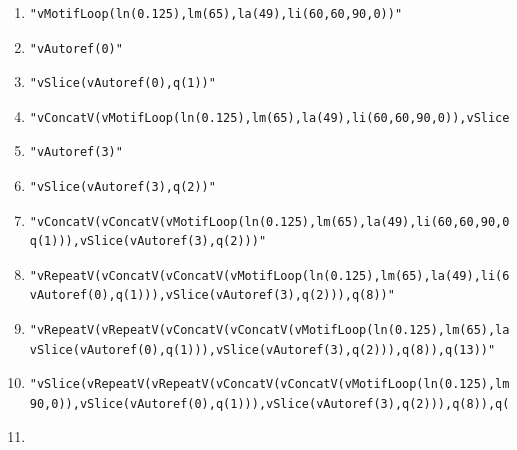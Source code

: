 \documentclass{article}
\begin{document}
\begin{table}[ht]
\hrulefill
{\small \begin{enumerate}[start=0]
\item \begin{verbatim}
"vMotifLoop(ln(0.125),lm(65),la(49),li(60,60,90,0))"
\end{verbatim}
\item \begin{verbatim}
"vAutoref(0)"
\end{verbatim}
\item \begin{verbatim}
"vSlice(vAutoref(0),q(1))"
\end{verbatim}
\item \begin{verbatim}
"vConcatV(vMotifLoop(ln(0.125),lm(65),la(49),li(60,60,90,0)),vSlice(vAutoref(0),q(1)))"
\end{verbatim}
\item \begin{verbatim}
"vAutoref(3)"
\end{verbatim}
\item \begin{verbatim}
"vSlice(vAutoref(3),q(2))"
\end{verbatim}
\item \begin{verbatim}
"vConcatV(vConcatV(vMotifLoop(ln(0.125),lm(65),la(49),li(60,60,90,0)),vSlice(vAutoref(0),
q(1))),vSlice(vAutoref(3),q(2)))"
\end{verbatim}
\item \begin{verbatim}
"vRepeatV(vConcatV(vConcatV(vMotifLoop(ln(0.125),lm(65),la(49),li(60,60,90,0)),vSlice(
vAutoref(0),q(1))),vSlice(vAutoref(3),q(2))),q(8))"
\end{verbatim}
\item \begin{verbatim}
"vRepeatV(vRepeatV(vConcatV(vConcatV(vMotifLoop(ln(0.125),lm(65),la(49),li(60,60,90,0)),
vSlice(vAutoref(0),q(1))),vSlice(vAutoref(3),q(2))),q(8)),q(13))"
\end{verbatim}
\item \begin{verbatim}
"vSlice(vRepeatV(vRepeatV(vConcatV(vConcatV(vMotifLoop(ln(0.125),lm(65),la(49),li(60,60,
90,0)),vSlice(vAutoref(0),q(1))),vSlice(vAutoref(3),q(2))),q(8)),q(13)),q(-12))"
\end{verbatim}
\item \begin{verbatim}

\end{verbatim}
\end{enumerate}}
\end{table}
\end{document}
